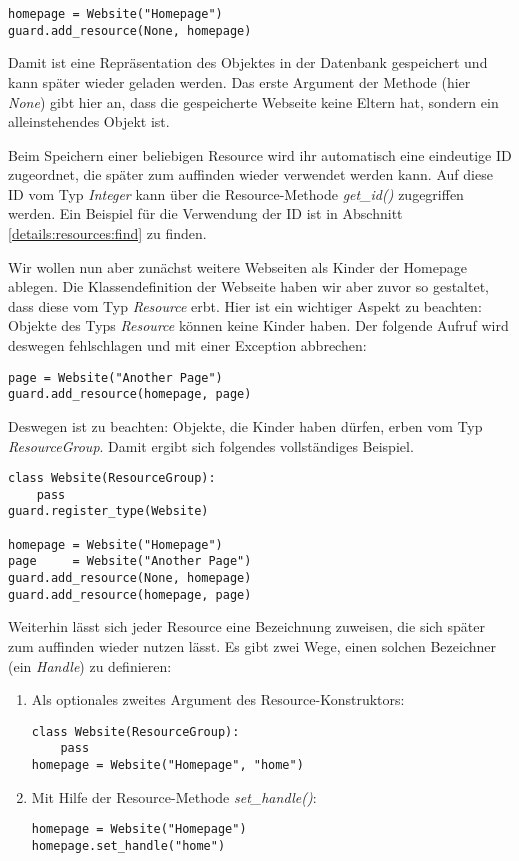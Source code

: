 \begin{lstlisting}
homepage = Website("Homepage")
guard.add_resource(None, homepage)
\end{lstlisting}

Damit ist eine Repräsentation des Objektes in der Datenbank gespeichert 
und kann später wieder geladen werden. Das erste Argument der Methode 
(hier {\it None}) gibt hier an, dass die gespeicherte Webseite keine Eltern 
hat, sondern ein alleinstehendes Objekt ist.

Beim Speichern einer beliebigen Resource wird ihr automatisch eine eindeutige 
ID zugeordnet, die später zum auffinden wieder verwendet werden kann. Auf 
diese ID vom Typ {\it Integer} kann über die Resource-Methode 
{\it get\_id()} zugegriffen werden. Ein Beispiel für die Verwendung der ID 
ist in Abschnitt \ref{details:resources:find} zu finden.

Wir wollen nun aber zunächst weitere Webseiten als Kinder der Homepage 
ablegen. Die Klassendefinition der Webseite haben wir aber zuvor so 
gestaltet, dass diese vom Typ {\it Resource} erbt. Hier ist ein wichtiger 
Aspekt zu beachten: 
Objekte des Typs {\it Resource} können keine Kinder haben. Der folgende 
Aufruf wird deswegen fehlschlagen und mit einer Exception abbrechen:

\begin{lstlisting}
page = Website("Another Page")
guard.add_resource(homepage, page)
\end{lstlisting}

Deswegen ist zu beachten: Objekte, die Kinder haben dürfen, erben vom Typ 
{\it ResourceGroup}. Damit ergibt sich folgendes vollständiges Beispiel.

\begin{lstlisting}
class Website(ResourceGroup):
    pass
guard.register_type(Website)

homepage = Website("Homepage")
page     = Website("Another Page")
guard.add_resource(None, homepage)
guard.add_resource(homepage, page)
\end{lstlisting}

Weiterhin lässt sich jeder Resource eine Bezeichnung zuweisen, die sich 
später zum auffinden wieder nutzen lässt. Es gibt zwei Wege, einen solchen 
Bezeichner (ein {\it Handle}) zu definieren:

\begin{enumerate}
\item Als optionales zweites Argument des Resource-Konstruktors:

\begin{lstlisting}
class Website(ResourceGroup):
    pass
homepage = Website("Homepage", "home")
\end{lstlisting}

\item Mit Hilfe der Resource-Methode {\it set\_handle()}:

\begin{lstlisting}
homepage = Website("Homepage")
homepage.set_handle("home")
\end{lstlisting}
\end{enumerate}

